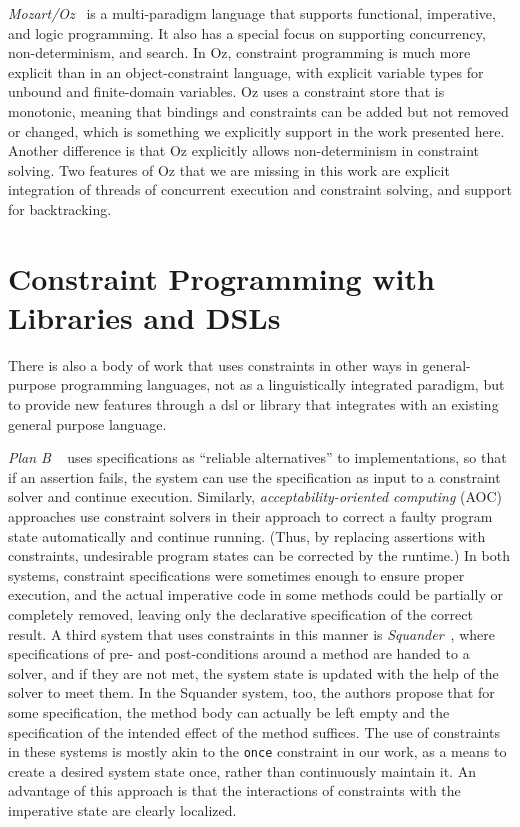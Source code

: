 \emph{Mozart/Oz}~\cite{van2003logic} is a multi-paradigm language that supports
functional, imperative, and logic programming. It also has a special focus on
supporting concurrency, non-determinism, and search.  In Oz, constraint
programming is much more explicit than in an object-constraint language, with
explicit variable types for unbound and finite-domain variables. Oz uses a
constraint store that is monotonic, meaning that bindings and constraints can be
added but not removed or changed, which is something we explicitly support in
the work presented here.  Another difference is that Oz explicitly allows
non-determinism in constraint solving. Two features of Oz that we are missing in
this work are explicit integration of threads of concurrent execution and
constraint solving, and support for backtracking.

\section{Constraint Programming with Libraries and DSLs}
\label{sec:constr-progr-libr}

There is also a body of work that uses constraints in other ways in
general-purpose programming languages, not as a linguistically integrated
paradigm, but to provide new features through a \ac{dsl} or library that
integrates with an existing general purpose language. 

\emph{Plan B}%
~\cite{samimi-ecoop-2010} uses specifications as ``reliable alternatives'' to
implementations, so that if an assertion fails, the system can use the
specification as input to a constraint solver and continue execution.
Similarly, %
\emph{acceptability-oriented computing} (AOC) approaches use constraint solvers
in their approach to correct a faulty program state automatically and continue
running. (Thus, by replacing assertions with constraints, undesirable program
states can be corrected by the runtime.) In both systems, constraint
specifications were sometimes enough to ensure proper execution, and the actual
imperative code in some methods could be partially or completely removed,
leaving only the declarative specification of the correct result. A third system
that uses constraints in this manner is
\emph{Squander}~\cite{Milicevic:2011:Squander}, where specifications of pre- and
post-conditions around a method are handed to a solver, and if they are not met,
the system state is updated with the help of the solver to meet them. In the
Squander system, too, the authors propose that for some specification, the
method body can actually be left empty and the specification of the intended
effect of the method suffices. The use of constraints in these systems is mostly
akin to the \lstinline{once} constraint in our work, as a means to create a
desired system state once, rather than continuously maintain it. An advantage of
this approach is that the interactions of constraints with the imperative state
are clearly localized.

